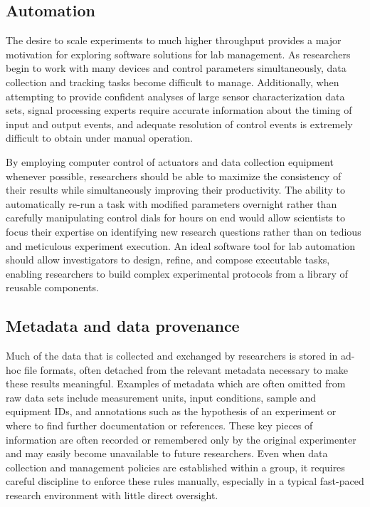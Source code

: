\documentclass[../thesis]{subfiles}
\begin{document}
\subsection{Automation}
The desire to scale experiments to much higher throughput provides a
major motivation for exploring software solutions for lab management.
As researchers begin to work with many devices and control
parameters simultaneously, data collection and tracking tasks become
difficult to manage. Additionally, when attempting to provide
confident analyses of large sensor characterization data sets, signal
processing experts require accurate information about the timing of
input and output events, and adequate resolution of control events is
extremely difficult to obtain under manual operation.

By employing computer control of actuators and data collection
equipment whenever possible, researchers should be able to maximize
the consistency of their results while simultaneously
improving their productivity. The ability to automatically re-run a
task with modified parameters overnight rather than carefully
manipulating control dials for hours on end would allow scientists
to focus their expertise on identifying new research questions rather
than on tedious and meticulous experiment execution.
An ideal software tool for lab automation should allow investigators
to design, refine, and compose executable tasks, enabling researchers
to build complex experimental protocols from a library of reusable
components.

\subsection{Metadata and data provenance}
Much of the data that is collected and exchanged by researchers is
stored in ad-hoc file formats, often detached from the relevant
metadata necessary to make these results meaningful. Examples of
metadata which are often omitted from raw data sets include
measurement units, input conditions, sample and equipment IDs, and
annotations such as the hypothesis of an experiment or where to find
further documentation or references. These key pieces of information
are often recorded or remembered only by the original experimenter and
may easily become unavailable to future researchers.
Even when data collection and management policies are established within
a group, it requires careful discipline to enforce these
rules manually, especially in a typical fast-paced research
environment with little direct oversight.
\end{document}

